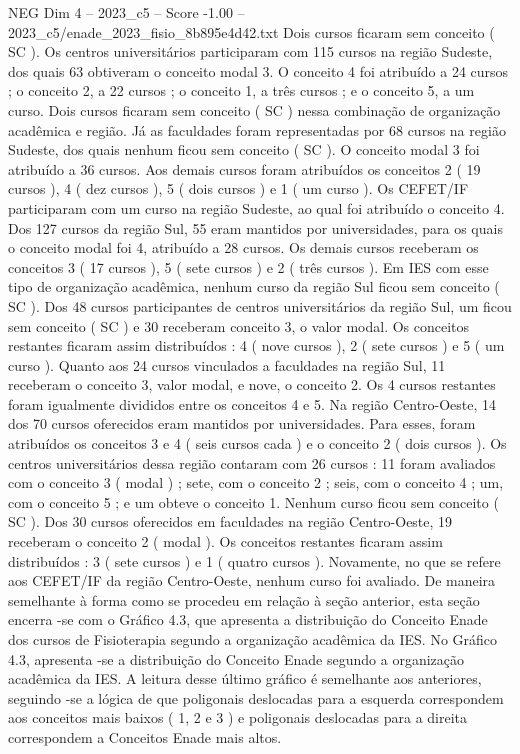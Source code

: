 \begin{textsample}{NEG Dim 4 – 2023\_c5 – Score -1.00 – 2023\_c5/enade\_2023\_fisio\_8b895e4d42.txt}
Dois cursos ficaram sem conceito ( SC ).
Os centros universitários participaram com 115 cursos na região Sudeste, dos quais 63 obtiveram o conceito modal 3.
O conceito 4 foi atribuído a 24 cursos ; o conceito 2, a 22 cursos ; o conceito 1, a três cursos ; e o conceito 5, a um curso.
Dois cursos ficaram sem conceito ( SC ) nessa combinação de organização acadêmica e região.
Já as faculdades foram representadas por 68 cursos na região Sudeste, dos quais nenhum ficou sem conceito ( SC ).
O conceito modal 3 foi atribuído a 36 cursos.
Aos demais cursos foram atribuídos os conceitos 2 ( 19 cursos ), 4 ( dez cursos ), 5 ( dois cursos ) e 1 ( um curso ).
Os CEFET/IF participaram com um curso na região Sudeste, ao qual foi atribuído o conceito 4.
Dos 127 cursos da região Sul, 55 eram mantidos por universidades, para os quais o conceito modal foi 4, atribuído a 28 cursos.
Os demais cursos receberam os conceitos 3 ( 17 cursos ), 5 ( sete cursos ) e 2 ( três cursos ).
Em IES com esse tipo de organização acadêmica, nenhum curso da região Sul ficou sem conceito ( SC ).
Dos 48 cursos participantes de centros universitários da região Sul, um ficou sem conceito ( SC ) e 30 receberam conceito 3, o valor modal.
Os conceitos restantes ficaram assim distribuídos : 4 ( nove cursos ), 2 ( sete cursos ) e 5 ( um curso ).
Quanto aos 24 cursos vinculados a faculdades na região Sul, 11 receberam o conceito 3, valor modal, e nove, o conceito 2.
Os 4 cursos restantes foram igualmente divididos entre os conceitos 4 e 5.
Na região Centro-Oeste, 14 dos 70 cursos oferecidos eram mantidos por universidades.
Para esses, foram atribuídos os conceitos 3 e 4 ( seis cursos cada ) e o conceito 2 ( dois cursos ).
Os centros universitários dessa região contaram com 26 cursos : 11 foram avaliados com o conceito 3 ( modal ) ; sete, com o conceito 2 ; seis, com o conceito 4 ; um, com o conceito 5 ; e um obteve o conceito 1.
Nenhum curso ficou sem conceito ( SC ).
Dos 30 cursos oferecidos em faculdades na região Centro-Oeste, 19 receberam o conceito 2 ( modal ).
Os conceitos restantes ficaram assim distribuídos : 3 ( sete cursos ) e 1 ( quatro cursos ).
Novamente, no que se refere aos CEFET/IF da região Centro-Oeste, nenhum curso foi avaliado.
De maneira semelhante à forma como se procedeu em relação à seção anterior, esta seção encerra -se com o Gráfico 4.3, que apresenta a distribuição do Conceito Enade dos cursos de Fisioterapia segundo a organização acadêmica da IES.
No Gráfico 4.3, apresenta -se a distribuição do Conceito Enade segundo a organização acadêmica da IES.
A leitura desse último gráfico é semelhante aos anteriores, seguindo -se a lógica de que poligonais deslocadas para a esquerda correspondem aos conceitos mais baixos ( 1, 2 e 3 ) e poligonais deslocadas para a direita correspondem a Conceitos Enade mais altos.

\end{textsample}
